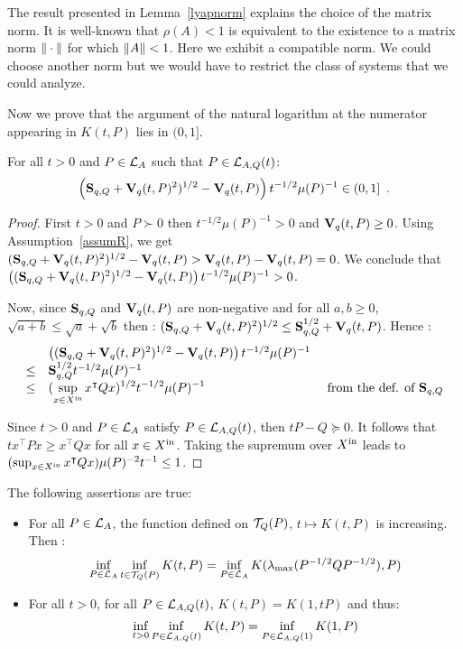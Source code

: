 \documentclass[10pt]{article}
\begin{document}
The result presented in Lemma~\ref{lyapnorm} explains the choice of the matrix norm. It is well-known that $\rho(A)<1$ is equivalent to the existence to a matrix norm $\| \cdot\|$ for which $\| A\|<1$. Here we exhibit a compatible norm. We could choose another norm but we would have to restrict the class of systems that we could analyze.    

Now we prove that the argument of the natural logarithm at the numerator appearing in $K(t,P)$ lies in $(0,1]$. 

\begin{lemma}
For all $t>0$ and $P\in\mathcal{L}_{A}$ such that $P\in\mathcal{L}_{A,Q}(t)$: \[
\left(\mathbf{S}_{q,Q}+\mathbf{V}_{q}(t,P)^2)^{1/2}-\mathbf{V}_{q}(t,P)\right) t^{-1/2}\mu(P)^{-1}\in (0,1]\enspace .
\]
\end{lemma}

\begin{proof}
First $t>0$ and $P\succ 0$ then $t^{-1/2}\mu(P)^{-1}>0$ and $\mathbf{V}_{q}(t,P)\geq 0$. Using Assumption~\ref{assumR}, we get $(\mathbf{S}_{q,Q}+\mathbf{V}_{q}(t,P)^2)^{1/2}-\mathbf{V}_{q}(t,P)> \mathbf{V}_{q}(t,P)-\mathbf{V}_{q}(t,P)=0$. We conclude that $\left((\mathbf{S}_{q,Q}+\mathbf{V}_{q}(t,P)^2)^{1/2}-\mathbf{V}_{q}(t,P)\right) t^{-1/2}\mu(P)^{-1}>0$. 

Now, since $\mathbf{S}_{q,Q}$ and $\mathbf{V}_{q}(t,P)$ are non-negative and for all $a,b\geq 0$, $\sqrt{a+b}\leq \sqrt{a}+\sqrt{b}$  then : 
$(\mathbf{S}_{q,Q}+\mathbf{V}_{q}(t,P)^2)^{1/2}\leq \mathbf{S}_{q,Q}^{1/2}+\mathbf{V}_{q}(t,P)$. Hence : 
\[
\begin{array}{lll}
&\left((\mathbf{S}_{q,Q}+\mathbf{V}_{q}(t,P)^2)^{1/2}-\mathbf{V}_{q}(t,P)\right) t^{-1/2}\mu(P)^{-1}& \\
\leq &\mathbf{S}_{q,Q}^{1/2} t^{-1/2}\mu(P)^{-1} & \\
\leq &(\displaystyle{\sup_{x\in X^\mathrm{in}} x^\intercal Q x})^{1/2} t^{-1/2}\mu(P)^{-1} & \text{ from the def. of } \mathbf{S}_{q,Q}
\end{array}
\]

Since $t>0$ and $P\in\mathcal{L}_{A}$ satisfy $P\in\mathcal{L}_{A,Q}(t)$, then $t P-Q\succeq 0$. It follows that 
$t x^\intercal P x\geq x^\intercal Q x$ for all $x\in X^\mathrm{in}$. Taking the supremum over $X^\mathrm{in}$ leads to $(\sup_{x\in X^\mathrm{in}} x^\intercal Q x)\mu(P)^{-2}t^{-1} \leq 1$. 
\end{proof}

\begin{prop}
\label{comp-prop}
The following assertions are true:
\begin{itemize}
\item For all $P\in\mathcal{L}_{A}$, the function defined on $\mathcal{T}_{Q}(P)$, $t\mapsto K(t,P)$ is increasing. Then : 
\begin{equation}
\label{infsolved}
\inf_{P\in\mathcal{L}_{A}} \inf_{t\in\mathcal{T}_{Q}(P)} K(t,P)=\inf_{P\in\mathcal{L}_{A}}K(\lambda_{\operatorname{max}}(P^{-1/2} Q P^{-1/2}),P)
\end{equation}
\item For all $t>0$, for all $P\in\mathcal{L}_{A,Q}(t)$, $K(t,P)=K(1,tP)$ and thus:
\[
\inf_{t>0} \inf_{P\in\mathcal{L}_{A,Q}(t)} K(t,P)=\inf_{P\in\mathcal{L}_{A,Q}(1)} K(1,P)
\]
\end{itemize}
\end{prop}
\end{document}
